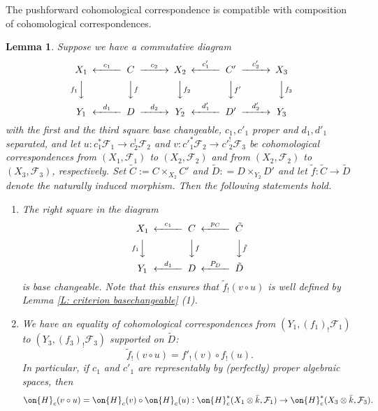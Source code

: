 \documentclass[11pt]{amsart}
\newtheorem{lem}[thm]{Lemma}
\theoremstyle{definition}
\theoremstyle{definition}
\theoremstyle{definition}
\numberwithin{equation}{subsection}
\def\calF{\mathcal{F}}
\begin{document}
The pushforward cohomological correspondence is compatible with composition of cohomological correspondences.
\begin{lem}
\label{AL:pushforward compatible with composition}
Suppose we have a commutative diagram
\[
\begin{CD}
X_1@<c_1<< C@>c_2>> X_2@<c'_1<< C'@>c'_2>> X_3\\
@Vf_1VV@VVfV@VVf_2V@VVf'V@VVf_3V\\
Y_1@<d_1<<D@>d_2>>Y_2@<d'_1<<D'@>d'_2>>Y_3
\end{CD}
\]
with the first and the third square base changeable, $c_1,  c'_1$ proper and $d_1,d'_1$ separated, and let $u: c_1^*\calF_1 \to c_2^!\calF_2$ and $v: c'^*_1\calF_2 \to c'^!_2 \calF_3$ be cohomological correspondences from $(X_1, \calF_1)$ to $(X_2, \calF_2)$ and  from $(X_2, \calF_2)$ to $(X_3, \calF_3)$, respectively.
Set $ \widetilde C := C \times_{X_2} C'$ and $\widetilde D: = D \times_{Y_2} D'$ and let $\tilde f: \widetilde C \to \widetilde D$ denote the naturally induced morphism.
Then the following statements hold.
\begin{enumerate}
\item The right square in the diagram 
\[\begin{CD}
X_1@<c_1<<C@<p_C<<\tilde C \\
@Vf_1VV@VVfV@VV\tilde fV\\
Y_1@<d_1<<D@<P_D<<\tilde D
\end{CD}\]
is base changeable. Note that this ensures that $\tilde f_!(v \circ u)$ is well defined by Lemma \ref{L: criterion basechangeable} (1).
\item We have an equality of cohomological correspondences from $(Y_1, (f_1)_!\calF_1)$ to $(Y_3, (f_3)_!\calF_3)$ supported on $\widetilde D$:
\[
\tilde f_!(v\circ u) = f'_!(v) \circ f_!(u).
\]
In particular, if $c_1$ and $c'_1$ are representably by (perfectly) proper algebraic spaces, then
$$\on{H}_c(v\circ u) = \on{H}_c(v) \circ \on{H}_c(u):\on{H}^*_c(X_1\otimes\bar k, \calF_1) \to \on{H}^*_c(X_3\otimes \bar k, \calF_3).$$ 
\end{enumerate}
\end{lem}
\end{document}
